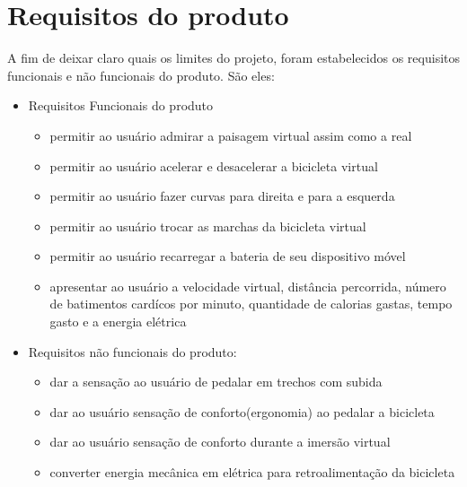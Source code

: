 \chapter[Requisitos do produto]{Requisitos do produto}

A fim de deixar claro quais os limites do projeto, foram estabelecidos os requisitos funcionais e não funcionais do produto. São eles:
\begin{itemize}
	\item Requisitos Funcionais do produto
		\begin{itemize}
		\item permitir ao usuário admirar a paisagem virtual assim como a real
		\item permitir ao usuário acelerar e desacelerar a bicicleta virtual
		\item permitir ao usuário fazer curvas para direita e para a esquerda
		\item permitir ao usuário trocar as marchas da bicicleta virtual
		\item permitir ao usuário recarregar a bateria de seu dispositivo móvel
		\item apresentar ao usuário a velocidade virtual, distância percorrida, número de batimentos cardícos por minuto, quantidade de calorias gastas, tempo gasto e a energia elétrica
		\end{itemize}
	\item Requisitos não funcionais do produto:
		\begin{itemize}
		\item dar a sensação ao usuário de pedalar em trechos com subida
		\item dar ao usuário sensação de conforto(ergonomia) ao pedalar a bicicleta
		\item dar ao usuário sensação de conforto durante a imersão virtual
		\item converter energia mecânica em elétrica para retroalimentação da bicicleta
		\end{itemize}
\end{itemize}